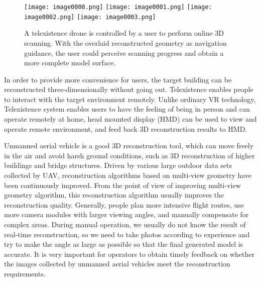 \documentclass[journal]{IEEEtran}
\begin{document}
\begin{figure}[t]
\centering %
  \texttt{[image: image0000.png]}
  \texttt{[image: image0001.png]}
  \texttt{[image: image0002.png]}
  \texttt{[image: image0003.png]}
    \caption{
    A telexistence drone is controlled by a user to perform online 
    3D scanning. 
  With the overlaid reconstructed geometry as navigation guidance, 
  the user could perceive scanning progress and obtain a more complete model surface.
  }
    \label{fig:teaser}
\end{figure}

In order to provide more convenience for users, the target building can be 
reconstructed three-dimensionally without going out. Telexistence\cite{734972} enables people to interact with the 
target environment remotely. Unlike ordinary VR 
technology, Telexistence system enables users to have the feeling of being 
in person and can operate remotely at home, head mounted display (HMD) \cite{BUTTERWORTH19923DM}can be used 
to view and operate remote environment\cite{Pittman:2014:EHT:2557500.2557527}, and feed back 3D reconstruction results \cite{7892326}to HMD.

Unmanned aerial vehicle is a good 3D reconstruction tool, which can move freely 
in the air and avoid harsh ground conditions\cite{PMID:29364873}, such as 3D reconstruction of higher 
buildings and bridge structures. Driven by various large outdoor data sets collected 
by UAV, reconstruction algorithms based on multi-view geometry\cite{CGV-052} 
have been continuously improved. From the point of view of improving multi-view 
geometry algorithm, this reconstruction algorithm usually improves the reconstruction 
quality. Generally, people plan more intensive flight routes, use more camera modules 
with larger viewing angles\cite{Ying2004Can}, and manually compensate for complex areas. During manual 
operation, we usually do not know the result of real-time reconstruction, so we need 
to take photos according to experience and try to make the angle as large as possible 
so that the final generated model is accurate. It is very important for operators to 
obtain timely feedback on whether the images collected by unmanned aerial vehicles meet 
the reconstruction requirements.
\end{document}

